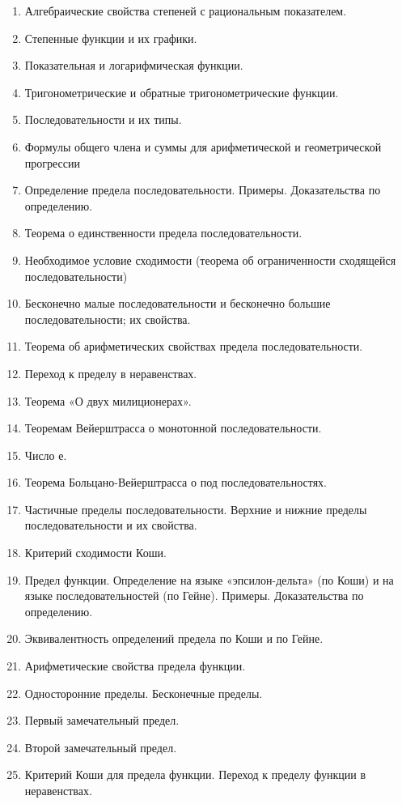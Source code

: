 \documentclass{article}
\begin{document}
\begin{enumerate}
    \item Алгебраические свойства степеней с рациональным показателем. 
    \item Степенные функции и их графики. 
    \item Показательная и логарифмическая функции. 
    \item Тригонометрические и обратные тригонометрические функции. 
    \item Последовательности и их типы. 
    \item Формулы общего члена и суммы для арифметической и геометрической прогрессии 
    \item Определение предела последовательности. Примеры. Доказательства по определению. 
    \item Теорема о единственности предела последовательности. 
    \item Необходимое условие сходимости (теорема об ограниченности сходящейся последовательности)
    \item Бесконечно малые последовательности и бесконечно большие последовательности; их свойства. 
    \item Теорема об арифметических свойствах предела последовательности. 
    \item Переход к пределу в неравенствах. 
    \item Теорема «О двух милиционерах». 
    \item Теоремам Вейерштрасса о монотонной последовательности. 
    \item Число е. 
    \item Теорема Больцано-Вейерштрасса о под последовательностях. 
    \item Частичные пределы последовательности. Верхние и нижние пределы последовательности и их свойства. 
    \item Критерий сходимости Коши. 
    \item Предел функции. Определение на языке «эпсилон-дельта» (по Коши) и на языке последовательностей (по Гейне). Примеры. Доказательства по определению. 
    \item Эквивалентность определений предела по Коши и по Гейне. 
    \item Арифметические свойства предела функции. 
    \item Односторонние пределы. Бесконечные пределы. 
    \item Первый замечательный предел. 
    \item Второй замечательный предел. 
    \item Критерий Коши для предела функции. Переход к пределу функции в неравенствах. 

\end{enumerate}
\end{document}
